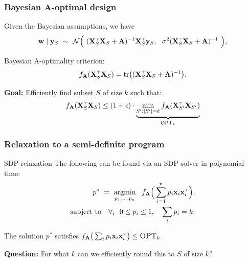 \documentclass{beamer}
\begin{document}
\begin{frame}
  \frametitle{Bayesian A-optimal design}
Given the Bayesian assumptions, we have
  \begin{align*}
  \w\mid \y_S \ \sim\ \Nc\Big(\ (\X_S^\top\X_S + \A)^{-1}\X_S^\top\y_S
  ,\ \ \sigma^2(\X_S^\top\X_S+\A)^{-1}\ \Big),
  \end{align*}
  \pause
  
  Bayesian A-optimality criterion:
\begin{align*}
f_{\A}(\X_S^\top\X_S)=\tr\big((\X_S^\top\X_S+\A)^{-1}\big).
\end{align*}
\pause

\textbf{Goal:} Efficiently find subset $S$ of size $k$ such that:
\begin{align*}
f_{\A}(\X_S^\top\X_S)\leq (1+\epsilon)\cdot\underbrace{\min_{S':|S'|=k}f_{\A}(\X_{S'}^\top\X_{S'})}_{\opt}
\end{align*}
\end{frame}

\begin{frame}
  \frametitle{Relaxation to a semi-definite program}
  \begin{block}{SDP relaxation}
The following can be found via an SDP solver in polynomial time:
  \begin{align*}
p^* \ = \  \argmin_{p_1,...,p_n}\ \
  f_{\A}\Big(\sum_{i=1}^np_i\x_i\x_i^\top\Big),\\
\text{subject to}\quad
  \forall_i\ \ 0\leq p_i\leq 1,\quad \sum_i p_i=k.
  \end{align*}
  \vspace{-5mm}
\end{block}
\pause
\vspace{5mm}

The solution $p^*$ satisfies $f_{\A}\big(\sum_{i}p_i\x_i\x_i^\top\big)\leq\opt$.\\[5mm]
\pause

\textbf{Question:}
For what $k$ can we efficiently round this to $S$ of size $k$?
    
\end{frame}
\end{document}

